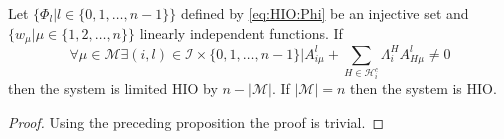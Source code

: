 \begin{theorem}
Let $\{\Phi_l|l\in\{0,1,\ldots,n-1\}\}$ defined by \eqref{eq:HIO:Phi} be an injective 
set and $\{w_\mu|\mu\in\{1,2,\ldots,n\}\}$ linearly independent functions. If
\begin{equation}
\left.\forall \mu\in\mathcal{M}\exists (i,l)\in \mathcal{I}\times 
\{0,1,\ldots,
n-1\} \right|  A^l_{i\mu} + \sum\limits_{H\in\mathcal{H}_i^c} 
\Lambda^H_i A^l_{H\mu} \neq 0 
\end{equation}
then the system is limited HIO by 
$n-|\mathcal{M}|$. If $|\mathcal{M}|=n$ then the system is HIO.
\end{theorem}
\begin{proof}
Using the preceding proposition the proof is trivial.
\end{proof}







